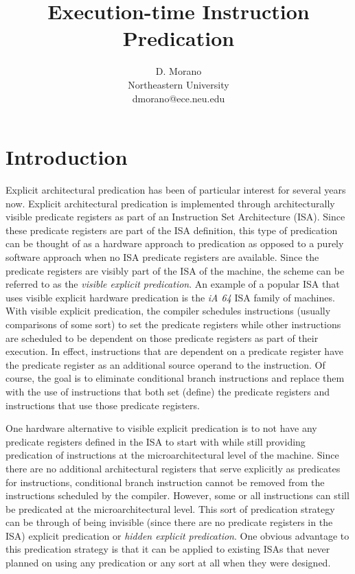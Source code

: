 \documentclass[10pt,dvips]{article}
\begin{document}
\parskip 2mm
%
%
\title{Execution-time Instruction Predication}
%
\author{
D. Morano\\
Northeastern University\\
dmorano@ece.neu.edu\\
}
%
\maketitle
%
%
%
\section{Introduction}
%
Explicit architectural predication has been of particular interest for
several years now.  Explicit architectural predication is implemented
through architecturally visible predicate registers as part of
an Instruction Set Architecture (ISA).  
Since these predicate
registers are part of the ISA definition, this type of 
predication can be thought of as a hardware approach to predication
as opposed to a purely software approach when no ISA predicate registers
are available.
Since the predicate registers are visibly part of the ISA of the machine,
the scheme can be referred to as the \textit{visible explicit predication}.
An example of a popular
ISA that uses visible explicit hardware predication is the \textit{iA 64}
ISA family of machines.
With visible explicit predication, the compiler schedules instructions
(usually comparisons of some sort) to set the predicate
registers while other instructions are scheduled to be
dependent on those predicate registers as part of their execution.
In effect, instructions that are dependent on a predicate register
have the predicate register as an additional source operand to
the instruction.  
Of course, the goal is to
eliminate conditional branch instructions and replace them with
the use of instructions that both set (define) the predicate registers and
instructions that use those predicate registers.

One hardware alternative to visible explicit predication is to not
have any predicate registers defined in the ISA to start with
while still providing predication of instructions at the microarchitectural
level of the machine.
Since there are no additional architectural registers that
serve explicitly as predicates for instructions, conditional branch
instruction cannot be removed from the instructions scheduled
by the compiler.  However, some or all instructions can still
be predicated at the microarchitectural level.  This sort of
predication strategy can be through of being invisible (since
there are no predicate registers in the ISA) explicit
predication or \textit{hidden explicit predication}.
One obvious advantage to this predication strategy is that it
can be applied to existing ISAs that never planned on using
any predication or any sort at all when they were designed.  
\end{document}
